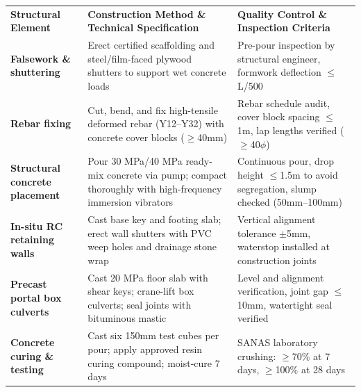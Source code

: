 {\fontsize{7.7pt}{9.8pt}\selectfont
\renewcommand{\arraystretch}{1.23}
\noindent
\begin{tabularx}{\textwidth}{@{}p{3.3cm} p{6.6cm} X@{}}
\rowcolor{mhnavy}
{\color{white}\bfseries Structural Element} & {\color{white}\bfseries Construction Method \& Technical Specification} & {\color{white}\bfseries Quality Control \& Inspection Criteria} \\
\rowcolor{mhbluelight}
\bfseries Falsework \& shuttering & Erect certified scaffolding and steel/film-faced plywood shutters to support wet concrete loads & Pre-pour inspection by structural engineer, formwork deflection $\le$ L/500 \\
\bfseries Rebar fixing & Cut, bend, and fix high-tensile deformed rebar (Y12--Y32) with concrete cover blocks ($\ge$40mm) & Rebar schedule audit, cover block spacing $\le$1m, lap lengths verified ($\ge$40$\phi$) \\
\rowcolor{mhbluelight}
\bfseries Structural concrete placement & Pour 30 MPa/40 MPa ready-mix concrete via pump; compact thoroughly with high-frequency immersion vibrators & Continuous pour, drop height $\le$1.5m to avoid segregation, slump checked (50mm--100mm) \\
\bfseries In-situ RC retaining walls & Cast base key and footing slab; erect wall shutters with PVC weep holes and drainage stone wrap & Vertical alignment tolerance $\pm$5mm, waterstop installed at construction joints \\
\rowcolor{mhbluelight}
\bfseries Precast portal box culverts & Cast 20 MPa floor slab with shear keys; crane-lift box culverts; seal joints with bituminous mastic & Level and alignment verification, joint gap $\le$10mm, watertight seal verified \\
\bfseries Concrete curing \& testing & Cast six 150mm test cubes per pour; apply approved resin curing compound; moist-cure 7 days & SANAS laboratory crushing: $\ge$70\% at 7 days, $\ge$100\% at 28 days \\
\end{tabularx}
\renewcommand{\arraystretch}{1}
}

\vfill

